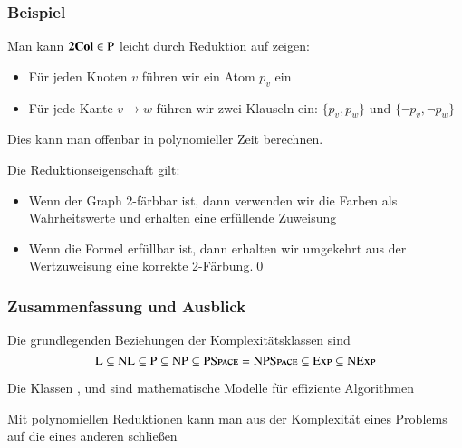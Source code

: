 \documentclass[aspectratio=1610,onlymath]{beamer}
\begin{document}
\begin{frame}\frametitle{Beispiel}



Man kann $\textbf{\textcolor{black}{2Col}}\in{\textsc{P}}$ leicht durch Reduktion auf  zeigen:
\begin{itemize}
\item Für jeden Knoten $v$ führen wir ein Atom $p_v$ ein
\item Für jede Kante $v\to w$ führen wir zwei Klauseln ein: $\{p_v,p_w\}$ und $\{\neg p_v,\neg p_w\}$\pause
\end{itemize}
Dies kann man offenbar in polynomieller Zeit berechnen.\bigskip\pause%

Die Reduktionseigenschaft gilt:
\begin{itemize}
\item Wenn der Graph 2-färbbar ist, dann verwenden wir die Farben als Wahrheitswerte und erhalten eine
	erfüllende Zuweisung
\item Wenn die Formel erfüllbar ist, dann erhalten wir umgekehrt aus der Wertzuweisung eine korrekte 2-Färbung.\qed
\end{itemize}

\end{frame}


\begin{frame}\frametitle{Zusammenfassung und Ausblick}

Die grundlegenden Beziehungen der Komplexitätsklassen sind
\[{\textsc{L}}\subseteq{\textsc{NL}}\subseteq {\textsc{P}}\subseteq{\textsc{NP}}\subseteq{\textsc{PSpace}}= {\textsc{NPSpace}}\subseteq {\textsc{Exp}}\subseteq {\textsc{NExp}}\]

Die Klassen ,  und  sind mathematische Modelle für effiziente Algorithmen\bigskip

Mit polynomiellen Reduktionen kann man aus der Komplexität eines Problems auf die eines anderen schließen\bigskip


\end{frame}
\end{document}

